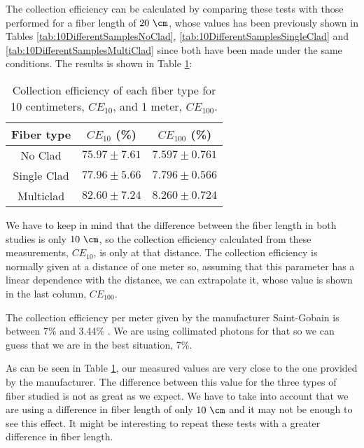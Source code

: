 The collection efficiency can be calculated by comparing these tests with those performed for a fiber length of $20~\cm$, whose values has been previously shown in Tables \ref{tab:10DifferentSamplesNoClad}, \ref{tab:10DifferentSamplesSingleClad} and \ref{tab:10DifferentSamplesMultiClad} since both have been made under the same conditions. The results is shown in Table \ref{tab:CollectionEfficiencyOfFibers}:



\begin{table}[htbp]
\begin{center}
\begin{tabular}{|c|c|c|}
\hline
Fiber type & $CE_{10}$ (\%) & $CE_{100}$ (\%) \\\hline \hline \hline
No Clad & $75.97 \pm 7.61$ & $7.597 \pm 0.761$ \\ \hline
Single Clad & $77.96 \pm 5.66$ & $7.796 \pm 0.566$ \\ \hline
Multiclad & $82.60 \pm 7.24$ & $8.260 \pm 0.724$ \\ \hline
\end{tabular}
\caption{Collection efficiency of each fiber type for 10 centimeters, $CE_{10}$, and 1 meter, $CE_{100}$.}
\label{tab:CollectionEfficiencyOfFibers}
\end{center}
\end{table}

We have to keep in mind that the difference between the fiber length in both studies is only $10~\cm$, so the collection efficiency calculated from these measurements, $CE_{10}$, is only at that distance. The collection efficiency is normally given at a distance of one meter so, assuming that this parameter has a linear dependence with the distance, we can extrapolate it, whose value is shown in the last column, $CE_{100}$.

The collection efficiency per meter given by the manufacturer Saint-Gobain is between 7\% and 3.44\% \cite{DataSheetBCF12Fiber}. We are using collimated photons for that so we can guess that we are in the best situation, 7\%. 

As can be seen in Table \ref{tab:CollectionEfficiencyOfFibers}, our measured values are very close to the one provided by the manufacturer. The difference between this value for the three types of fiber studied is not as great as we expect. We have to take into account that we are using a difference in fiber length of only $10~\cm$ and it may not be enough to see this effect. It might be interesting to repeat these tests with a greater difference in fiber length.